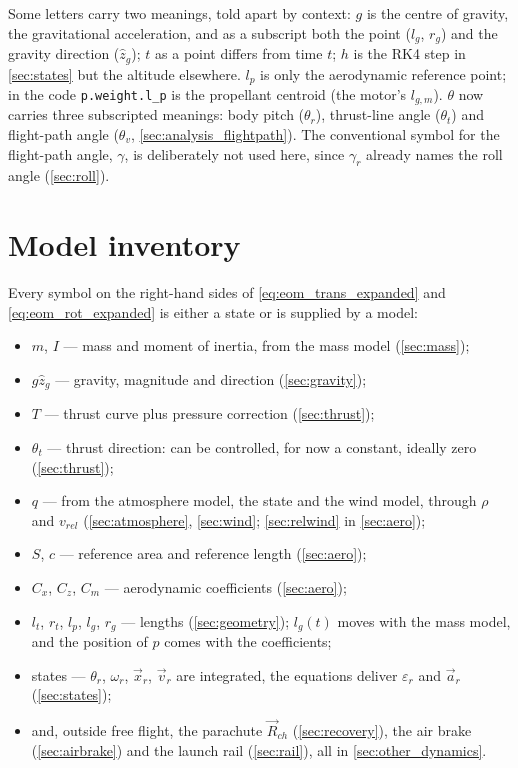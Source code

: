 Some letters carry two meanings, told apart by context: $g$ is the centre of gravity, the
gravitational acceleration, and as a subscript both the point ($l_g$, $r_g$) and the gravity
direction ($\hat{z}_g$); $t$ as a point differs from time $t$; $h$ is the RK4 step in
\autoref{sec:states} but the altitude elsewhere. $l_p$ is only the aerodynamic reference point; in
the code \texttt{p.weight.l\_p} is the propellant centroid (the motor's $l_{g,m}$). $\theta$ now
carries three subscripted meanings: body pitch ($\theta_r$), thrust-line angle ($\theta_t$) and
flight-path angle ($\theta_v$, \autoref{sec:analysis_flightpath}). The conventional symbol for the
flight-path angle, $\gamma$, is deliberately not used here, since $\gamma_r$ already names the roll
angle (\autoref{sec:roll}).

\section{Model inventory}\label{sec:eom_inventory}
Every symbol on the right-hand sides of \autoref{eq:eom_trans_expanded} and
\autoref{eq:eom_rot_expanded} is either a state or is supplied by a model:
\begin{itemize}
    \item $m$, $I$ --- mass and moment of inertia, from the mass model (\autoref{sec:mass});
    \item $g\hat{z}_g$ --- gravity, magnitude and direction (\autoref{sec:gravity});
    \item $T$ --- thrust curve plus pressure correction (\autoref{sec:thrust});
    \item $\theta_t$ --- thrust direction: can be controlled, for now a constant, ideally zero
    (\autoref{sec:thrust});
    \item $q$ --- from the atmosphere model, the state and the wind model, through $\rho$ and
    $v_{rel}$ (\autoref{sec:atmosphere}, \autoref{sec:wind}; \autoref{sec:relwind} in
    \autoref{sec:aero});
    \item $S$, $c$ --- reference area and reference length (\autoref{sec:aero});
    \item $C_x$, $C_z$, $C_m$ --- aerodynamic coefficients (\autoref{sec:aero});
    \item $l_t$, $r_t$, $l_p$, $l_g$, $r_g$ --- lengths (\autoref{sec:geometry}); $l_g(t)$ moves
    with the mass model, and the position of $p$ comes with the coefficients;
    \item states --- $\theta_r$, $\omega_r$, $\vec{x}_r$, $\vec{v}_r$ are integrated, the equations
    deliver $\varepsilon_r$ and $\vec{a}_r$ (\autoref{sec:states});
    \item and, outside free flight, the parachute $\vec{R}_{ch}$ (\autoref{sec:recovery}), the air
    brake (\autoref{sec:airbrake}) and the launch rail (\autoref{sec:rail}), all in
    \autoref{sec:other_dynamics}.
\end{itemize}

